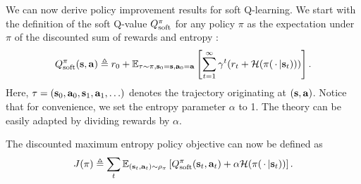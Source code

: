 We can now derive policy improvement results for soft Q-learning. We start with the definition of the soft Q-value $Q^{\pi}_{\text{soft}}$ for any policy $\pi$ as the expectation under $\pi$ of the discounted sum of rewards and entropy :
\begin{equation}
\begin{split}
    Q^{\pi}_{\text{soft}}(\mathbf{s},\mathbf{a}) \triangleq r_0 + \operatorname{\mathbb{E}}_{\tau \sim \pi, \mathbf{s}_0=\mathbf{s}, \mathbf{a}_0=\mathbf{a}}\left[\sum_{t=1}^{\infty} \gamma^t (r_t + \mathcal{H}(\pi(\,\cdot\, | \mathbf{s}_t)))\right].
\end{split}
\end{equation}
Here, $\tau = (\mathbf{s}_0, \mathbf{a}_0, \mathbf{s}_1, \mathbf{a}_1, \ldots)$ denotes the trajectory originating at $(\mathbf{s},\mathbf{a})$. Notice that for convenience, we set the entropy parameter $\alpha$ to 1. The theory can be easily adapted by dividing rewards by $\alpha$. 

The discounted maximum entropy policy objective can now be defined as
\begin{equation}
J(\pi)\triangleq \sum_t \mathbb{E}_{({\mathbf{s}_t},{\mathbf{a}_t}) \sim \rho_\pi}\left[Q^{\pi}_{\text{soft}}({\mathbf{s}_t},{\mathbf{a}_t}) + \alpha\mathcal{H}(\pi(\,\cdot\,|{\mathbf{s}_t}))\right].
\end{equation}

